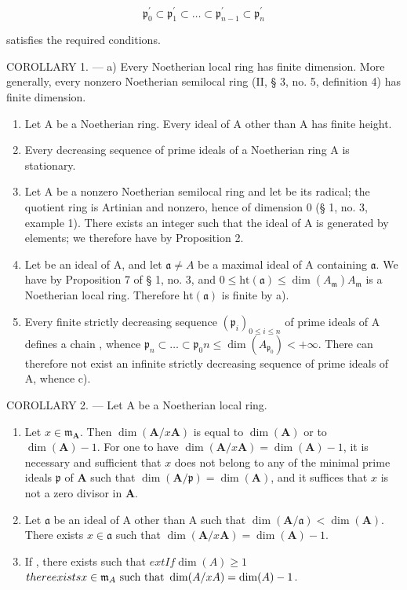 \[
\mathfrak {p} _ {0} ^ {\prime} \subset \mathfrak {p} _ {1} ^ {\prime} \subset \dots \subset \mathfrak {p} _ {n - 1} ^ {\prime} \subset \mathfrak {p} _ {n} ^ {\prime}
\]

satisfies the required conditions.

COROLLARY 1. --- a) Every Noetherian local ring has finite dimension. More generally, every nonzero Noetherian semilocal ring (II, § 3, no. 5, definition 4) has finite dimension.

\begin{enumerate}
\def\labelenumi{\alph{enumi})}
\setcounter{enumi}{1}
\item
  Let A be a Noetherian ring. Every ideal of A other than A has finite height.
\item
  Every decreasing sequence of prime ideals of a Noetherian ring A is stationary.
\item
  Let A be a nonzero Noetherian semilocal ring and let  be its radical; the quotient ring  is Artinian and nonzero, hence of dimension 0 (§ 1, no. 3, example 1). There exists an integer  such that the ideal  of A is generated by  elements; we therefore have  by Proposition 2.
\item
  Let  be an ideal of A, and let \(\mathfrak{a} \neq A\) be a maximal ideal of A containing \(\mathfrak{a}\). We have  by Proposition 7 of § 1, no. 3, and \(0 \leqslant \mathrm{ht}(\mathfrak{a}) \leqslant \dim(A_{\mathfrak{m}})\)\(A_{\mathfrak{m}}\) is a Noetherian local ring. Therefore \(\mathrm{ht}(\mathfrak{a})\) is finite by a).
\item
  Every finite strictly decreasing sequence \((\mathfrak{p}_{i})_{0\leqslant i\leqslant n}\) of prime ideals of A defines a chain , whence \(\mathfrak p_{n}\subset\ldots\subset\mathfrak p_{0}\)\(n\leqslant\dim(A_{\mathfrak p_{0}})<+\infty\). There can therefore not exist an infinite strictly decreasing sequence of prime ideals of A, whence c).
\end{enumerate}

COROLLARY 2. --- Let A be a Noetherian local ring.

\begin{enumerate}
\def\labelenumi{\alph{enumi})}
\item
  Let \(x \in \mathfrak{m}_{\mathbf{A}}\). Then \(\dim(\mathbf{A}/x\mathbf{A})\) is equal to \(\dim(\mathbf{A})\) or to \(\dim(\mathbf{A}) - 1\). For one to have \(\dim(\mathbf{A}/x\mathbf{A}) = \dim(\mathbf{A}) - 1\), it is necessary and sufficient that \(x\) does not belong to any of the minimal prime ideals \(\mathfrak{p}\) of \(\mathbf{A}\) such that \(\dim(\mathbf{A}/\mathfrak{p}) = \dim(\mathbf{A})\), and it suffices that \(x\) is not a zero divisor in \(\mathbf{A}\).
\item
  Let \(\mathfrak{a}\) be an ideal of A other than A such that \(\dim(\mathbf{A}/\mathfrak{a}) < \dim(\mathbf{A})\). There exists \(x \in \mathfrak{a}\) such that \(\dim(\mathbf{A}/x\mathbf{A}) = \dim(\mathbf{A}) - 1\).
\item
  If , there exists  such that \(	ext{If} \dim(A) \geqslant 1\)\(there exists x \in \mathfrak{m}_{A} \text{ \text{such that} } \dim(A/xA) = \dim(A) - 1\).
\end{enumerate}

